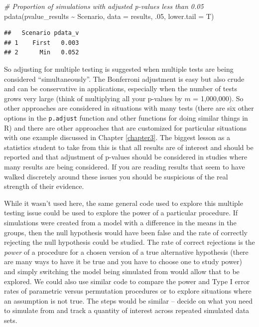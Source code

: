 \documentclass[
]{book}
\newenvironment{Shaded}{\begin{snugshade}}{\end{snugshade}}
\newcommand{\AttributeTok}[1]{\textcolor[rgb]{0.77,0.63,0.00}{#1}}
\newcommand{\CommentTok}[1]{\textcolor[rgb]{0.56,0.35,0.01}{\textit{#1}}}
\newcommand{\DecValTok}[1]{\textcolor[rgb]{0.00,0.00,0.81}{#1}}
\newcommand{\FunctionTok}[1]{\textcolor[rgb]{0.00,0.00,0.00}{#1}}
\newcommand{\NormalTok}[1]{#1}
\newcommand{\SpecialCharTok}[1]{\textcolor[rgb]{0.00,0.00,0.00}{#1}}
\begin{document}
\begin{Shaded}
\begin{Highlighting}[]
\CommentTok{\# Proportion of simulations with adjusted p{-}values less than 0.05}
\FunctionTok{pdata}\NormalTok{(pvalue\_results }\SpecialCharTok{\textasciitilde{}}\NormalTok{ Scenario, }\AttributeTok{data =}\NormalTok{ results, .}\DecValTok{05}\NormalTok{, }\AttributeTok{lower.tail =}\NormalTok{ T)}
\end{Highlighting}
\end{Shaded}

\begin{verbatim}
##   Scenario pdata_v
## 1    First   0.003
## 2      Min   0.052
\end{verbatim}

\indent So adjusting for multiple testing is suggested when multiple tests are being considered ``simultaneously''. The Bonferroni adjustment is easy but also crude and can be conservative in applications, especially when the number of tests grows very large (think of multiplying all your p-values by \(m\) = 1,000,000). So other approaches are considered in situations with many tests (there are six other options in the \texttt{p.adjust} function and other functions for doing similar things in R) and there are other approaches that are customized for particular situations with one example discussed in Chapter \ref{chapter3}. The biggest lesson as a statistics student to take from this is that all results are of interest and should be reported and that adjustment of p-values should be considered in studies where many results are being considered. If you are reading results that seem to have walked discretely around these issues you should be suspicious of the real strength of their evidence.

\indent While it wasn't used here, the same general code used to explore this multiple testing issue could be used to explore the power of a particular procedure. If simulations were created from a model with a difference in the means in the groups, then the null hypothesis would have been false and the rate of correctly rejecting the null hypothesis could be studied. The rate of correct rejections is the \emph{power} of a procedure for a chosen version of a true alternative hypothesis (there are many ways to have it be true and you have to choose one to study power) and simply switching the model being simulated from would allow that to be explored. We could also use similar code to compare the power and Type I error rates of parametric versus permutation procedures or to explore situations where an assumption is not true. The steps would be similar -- decide on what you need to simulate from and track a quantity of interest across repeated simulated data sets.
\end{document}
